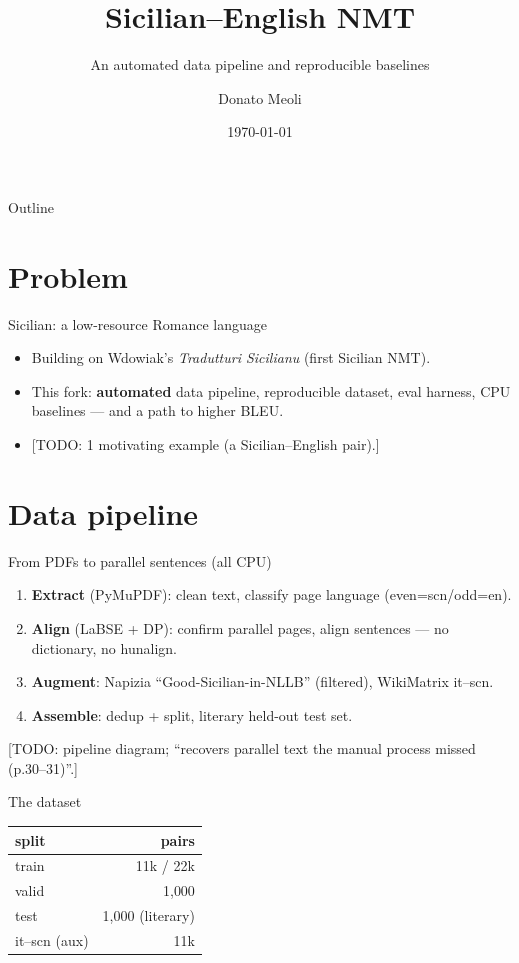 \documentclass{beamer}
\title[Sicilian NMT]{Sicilian--English NMT}
\subtitle{An automated data pipeline and reproducible baselines}
\author{Donato Meoli}
\date{\today}
\newcommand{\TODO}[1]{{\color{red}[TODO: #1]}}
\begin{document}
\frame{\titlepage}

\begin{frame}{Outline}
  \tableofcontents
\end{frame}

\section{Problem}
\begin{frame}{Sicilian: a low-resource Romance language}
  \begin{itemize}
    \item Building on Wdowiak's \emph{Tradutturi Sicilianu} (first Sicilian NMT).
    \item This fork: \textbf{automated} data pipeline, reproducible dataset, eval harness,
          CPU baselines --- and a path to higher BLEU.
    \item \TODO{1 motivating example (a Sicilian--English pair).}
  \end{itemize}
\end{frame}

\section{Data pipeline}
\begin{frame}{From PDFs to parallel sentences (all CPU)}
  \begin{enumerate}
    \item \textbf{Extract} (PyMuPDF): clean text, classify page language (even=scn/odd=en).
    \item \textbf{Align} (LaBSE + DP): confirm parallel pages, align sentences --- no
          dictionary, no hunalign.
    \item \textbf{Augment}: Napizia ``Good-Sicilian-in-NLLB'' (filtered), WikiMatrix it--scn.
    \item \textbf{Assemble}: dedup + split, literary held-out test set.
  \end{enumerate}
  \TODO{pipeline diagram; ``recovers parallel text the manual process missed (p.30--31)''.}
\end{frame}

\begin{frame}{The dataset}
  \begin{table}\centering
  \begin{tabular}{lr}
    \toprule split & pairs \\\midrule
    train & 11k / 22k \\ valid & 1{,}000 \\ test & 1{,}000 (literary) \\
    it--scn (aux) & 11k \\\bottomrule
  \end{tabular}
  \end{table}
\end{frame}
\end{document}
